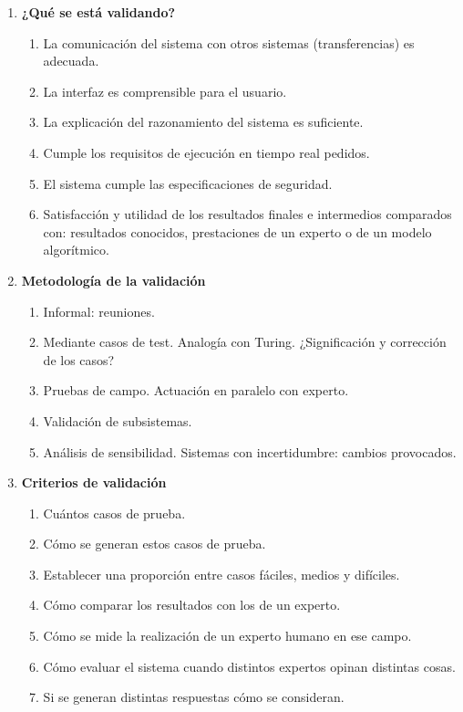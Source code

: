 \documentclass[12pt]{article}
\begin{document}
\begin{enumerate}
\item \textbf{¿Qué se está validando?}
\begin{enumerate}
\item La comunicación del sistema con otros sistemas (transferencias) es adecuada.
\item La interfaz es comprensible para el usuario.
\item La explicación del razonamiento del sistema es suficiente.
\item Cumple los requisitos de ejecución en tiempo real pedidos.
\item El sistema cumple las especificaciones de seguridad.
\item Satisfacción y utilidad de los resultados finales e intermedios comparados con: resultados conocidos, prestaciones de un experto o de un modelo algorítmico.
\end{enumerate}
\item \textbf{Metodología de la validación}
\begin{enumerate}
\item Informal: reuniones.
\item Mediante casos de test. Analogía con Turing. ¿Significación y corrección de los casos?
\item Pruebas de campo. Actuación en paralelo con experto.
\item Validación de subsistemas.
\item Análisis de sensibilidad. Sistemas con incertidumbre: cambios provocados.
\end{enumerate}
\item \textbf{Criterios de validación}
\begin{enumerate}
\item Cuántos casos de prueba.
\item Cómo se generan estos casos de prueba.
\item Establecer una proporción entre casos fáciles, medios y difíciles.
\item Cómo comparar los resultados con los de un experto.
\item Cómo se mide la realización de un experto humano en ese campo.
\item Cómo evaluar el sistema cuando distintos expertos opinan distintas cosas.
\item Si se generan distintas respuestas cómo se consideran.
\end{enumerate}
\end{enumerate}
\end{document}
